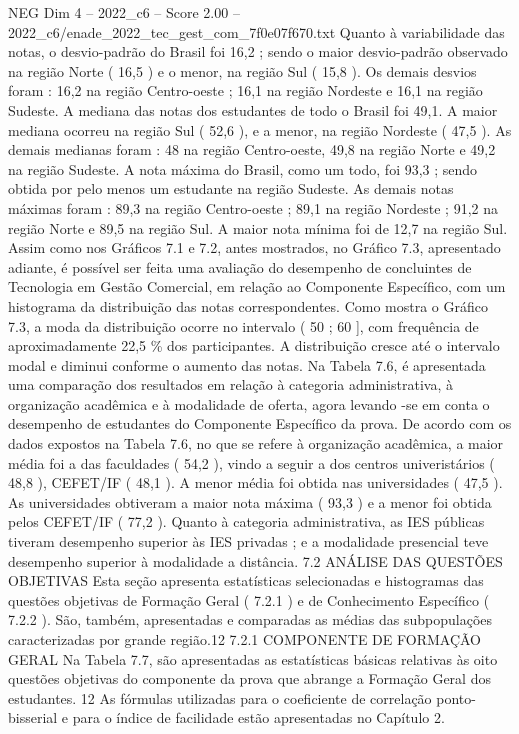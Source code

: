 \begin{textsample}{NEG Dim 4 – 2022\_c6 – Score 2.00 – 2022\_c6/enade\_2022\_tec\_gest\_com\_7f0e07f670.txt}
Quanto à variabilidade das notas, o desvio-padrão do Brasil foi 16,2 ; sendo o maior desvio-padrão observado na região Norte ( 16,5 ) e o menor, na região Sul ( 15,8 ).
Os demais desvios foram : 16,2 na região Centro-oeste ; 16,1 na região Nordeste e 16,1 na região Sudeste.
A mediana das notas dos estudantes de todo o Brasil foi 49,1.
A maior mediana ocorreu na região Sul ( 52,6 ), e a menor, na região Nordeste ( 47,5 ).
As demais medianas foram : 48 na região Centro-oeste, 49,8 na região Norte e 49,2 na região Sudeste.
A nota máxima do Brasil, como um todo, foi 93,3 ; sendo obtida por pelo menos um estudante na região Sudeste.
As demais notas máximas foram : 89,3 na região Centro-oeste ; 89,1 na região Nordeste ; 91,2 na região Norte e 89,5 na região Sul.
A maior nota mínima foi de 12,7 na região Sul.
Assim como nos Gráficos 7.1 e 7.2, antes mostrados, no Gráfico 7.3, apresentado adiante, é possível ser feita uma avaliação do desempenho de concluintes de Tecnologia em Gestão Comercial, em relação ao Componente Específico, com um histograma da distribuição das notas correspondentes.
Como mostra o Gráfico 7.3, a moda da distribuição ocorre no intervalo ( 50 ; 60 ], com frequência de aproximadamente 22,5 \% dos participantes.
A distribuição cresce até o intervalo modal e diminui conforme o aumento das notas.
Na Tabela 7.6, é apresentada uma comparação dos resultados em relação à categoria administrativa, à organização acadêmica e à modalidade de oferta, agora levando -se em conta o desempenho de estudantes do Componente Específico da prova.
De acordo com os dados expostos na Tabela 7.6, no que se refere à organização acadêmica, a maior média foi a das faculdades ( 54,2 ), vindo a seguir a dos centros univeristários ( 48,8 ), CEFET/IF ( 48,1 ).
A menor média foi obtida nas universidades ( 47,5 ).
As universidades obtiveram a maior nota máxima ( 93,3 ) e a menor foi obtida pelos CEFET/IF ( 77,2 ).
Quanto à categoria administrativa, as IES públicas tiveram desempenho superior às IES privadas ; e a modalidade presencial teve desempenho superior à modalidade a distância. 7.2 ANÁLISE DAS QUESTÕES OBJETIVAS Esta seção apresenta estatísticas selecionadas e histogramas das questões objetivas de Formação Geral ( 7.2.1 ) e de Conhecimento Específico ( 7.2.2 ).
São, também, apresentadas e comparadas as médias das subpopulações caracterizadas por grande região.12 7.2.1 COMPONENTE DE FORMAÇÃO GERAL Na Tabela 7.7, são apresentadas as estatísticas básicas relativas às oito questões objetivas do componente da prova que abrange a Formação Geral dos estudantes. 12 As fórmulas utilizadas para o coeficiente de correlação ponto-bisserial e para o índice de facilidade estão apresentadas no Capítulo 2.

\end{textsample}
